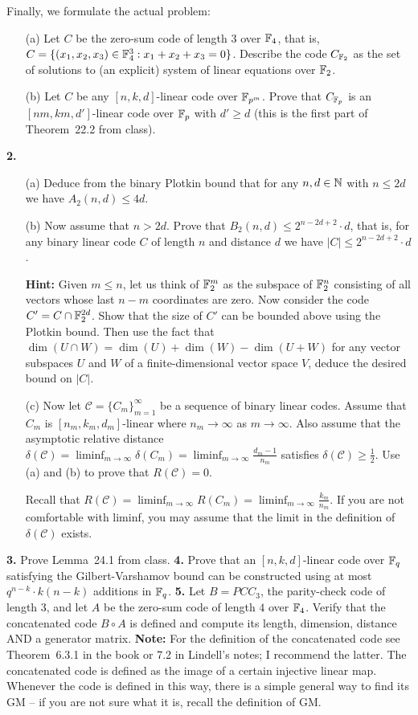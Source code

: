 \documentclass[12pt]{amsart}
\begin{document}
Finally, we formulate the actual problem:
\begin{itemize}
\item[(a)] Let $C$ be the zero-sum code of length $3$ over ${\mathbb F}_4$, that is, $C=\{(x_1,x_2,x_3)\in{\mathbb F}_4^3: x_1+x_2+x_3=0\}$.
Describe the code $C_{{\mathbb F}_2}$ as the set of solutions to (an explicit) system of linear equations over ${\mathbb F}_2$.
\item[(b)] Let $C$ be any $[n,k,d]$-linear code over ${\mathbb F}_{p^m}$. Prove that $C_{{\mathbb F}_p}$ is an $[nm,km,d']$-linear code over ${\mathbb F}_{p}$ with $d'\geq d$ (this is the first part of Theorem~22.2 from class).
 \end{itemize}
\skv
{\bf 2.} 
\begin{itemize}
\item[(a)] Deduce from the binary Plotkin bound that for any $n,d\in{\mathbb N}$ with $n\leq 2d$ we have $A_2(n,d)\leq 4d$.
\item[(b)] Now assume that $n>2d$. Prove that $B_2(n,d)\leq 2^{n-2d+2}\cdot d$, that is, for any binary linear code $C$ of length $n$ and distance $d$ we have $|C|\leq 2^{n-2d+2}\cdot d$. 

{\bf Hint:} Given $m\leq n$, let us think of ${\mathbb F}_2^m$ as the subspace of
${\mathbb F}_2^n$ consisting of all vectors whose last $n-m$ coordinates are zero. Now consider the code $C'=C\cap {\mathbb F}_{2}^{2d}$.
Show that the size of $C'$ can be bounded above using the Plotkin bound. Then use the fact that 
$\dim(U\cap W)=\dim(U)+\dim(W)-\dim(U+W)$ for any vector subspaces $U$ and $W$ of a finite-dimensional vector space $V$,
deduce the desired bound on $|C|$. 
\item[(c)] Now let $\mathcal C=\{C_m\}_{m=1}^{\infty}$ be a sequence of binary linear codes. Assume that 
$C_m$ is $[n_m,k_m,d_m]$-linear where $n_m\to\infty$ as $m\to\infty$. Also assume that the asymptotic relative distance 
$\delta(\mathcal C)=\liminf_{m\to\infty}\delta(C_m)=\liminf_{m\to\infty} \frac{d_m-1}{n_m}$ satisfies
$\delta(\mathcal C)\geq \frac{1}{2}$. Use (a) and (b) to prove that $R(\mathcal C)=0$. 

Recall that $R(\mathcal C)=\liminf_{m\to\infty}R(C_m)=\liminf_{m\to\infty} \frac{k_m}{n_m}$. If you are not comfortable with
liminf, you may assume that the limit in the definition of $\delta(\mathcal C)$ exists.
\end{itemize}
\skv
{\bf 3.} Prove Lemma~24.1 from class.
\skv
{\bf 4.} Prove that an $[n,k,d]$-linear code over ${\mathbb F}_q$ satisfying the Gilbert-Varshamov bound can be constructed using at most $q^{n-k}\cdot k(n-k)$ additions in ${\mathbb F}_q$.  
\skv
{\bf 5.} Let $B=PCC_3$, the parity-check code of length $3$, and let $A$ be the zero-sum code of length $4$ over ${\mathbb F}_4$. Verify that the concatenated code $B\circ A$ is defined and compute its length, dimension, distance AND a generator matrix.
{\bf Note:} For the definition of the concatenated code see Theorem~6.3.1 in the book or 7.2 in Lindell's notes; I recommend the latter. The concatenated code is defined as the image of a certain injective linear map. Whenever the code is defined in this way, there is a simple general way to find its GM -- if you are not sure what it is, recall the definition of GM. 
\end{document}
